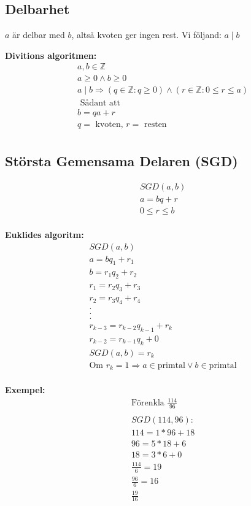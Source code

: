\begin{multicols}{2}
\section{Delbarhet}
$a$ är delbar med $b$, altså kvoten ger ingen rest. 
Vi följand: $a \mid b$


\textbf{Divitions algoritmen:}
\begin{align*}
  &a, b \in \mathbb{Z}  \\
  &a  \geq 0 \land b  \geq  0 \\
  &a \mid b \Rightarrow (q \in \mathbb{Z} : q \geq 0) \land (r \in \mathbb{Z} : 0 \leq r \leq a) \\
  &\text{ Sådant att} \\
  &b = q a + r\\
  &q = \text{ kvoten, } r = \text{ resten} \\
\end{align*}


\subsection{Största Gemensama Delaren (SGD)}
\begin{align*}
  &SGD(a,b) \\
  &a = bq + r \\
  &0 \leq r \leq b \\
\end{align*}

\textbf{Euklides algoritm:}
\begin{align*}
  &SGD(a,b) \\
  &a = bq_1 + r_1 \\
  &b = r_1q_2 + r_2 \\
  &r_1 = r_2q_3 + r_3 \\
  &r_2 = r_3q_4 + r_4 \\
  &. \\
  &. \\
  &. \\
  &r_{k-3} = r_{k-2}q_{k-1} + r_{k} \\
  &r_{k-2} = r_{k-1}q_k + 0 \\
  &SGD(a,b) = r_{k} \\
  &\text{Om } r_{k} = 1 \Rightarrow a \in \text{primtal} \lor b \in \text{primtal} \\
\end{align*}

\textbf{Exempel:}
\begin{align*}
  &\text{Förenkla } \frac{114}{96} \\
  &\\
  &SGD(114,96):    \\
  &114 = 1*96 + 18 \\
  &96  = 5*18 + 6  \\
  &18  = 3*6  + 0  \\
  &\frac{114}{6} = 19 \\
  &\frac{96}{6}  = 16 \\
  &\frac{19}{16} \\
\end{align*}



\end{multicols}
